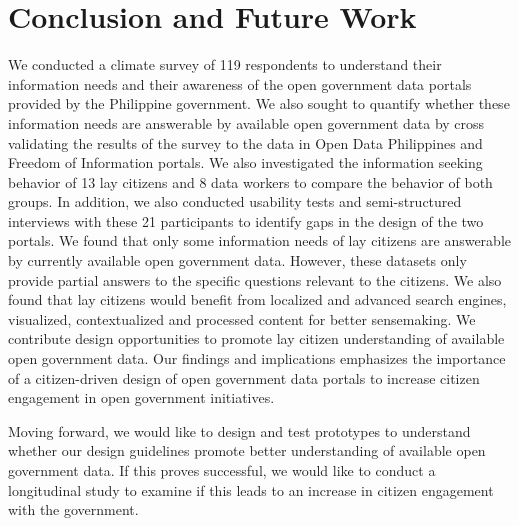 \documentclass{sigchi}
\begin{document}
\section{Conclusion and Future Work}
We conducted a climate survey of 119 respondents to understand their information needs and their awareness of the open government data portals provided by the Philippine government. We also sought to quantify whether these information needs are answerable by available open government data by cross validating the results of the survey to the data in Open Data Philippines and Freedom of Information portals. We also investigated the information seeking behavior of 13 lay citizens and 8 data workers to compare the behavior of both groups. In addition, we also conducted usability tests and semi-structured interviews with these 21 participants to identify gaps in the design of the two portals. We found that only some information needs of lay citizens are answerable by currently available open government data. However, these datasets only provide partial answers to the specific questions relevant to the citizens. We also found that lay citizens would benefit from localized and advanced search engines, visualized, contextualized and processed content for better sensemaking. We contribute design opportunities to promote lay citizen understanding of available open government data. Our findings and implications emphasizes the importance of a citizen-driven design of open government data portals to increase citizen engagement in open government initiatives.

Moving forward, we would like to design and test prototypes to understand whether our design guidelines promote better understanding of available open government data. If this proves successful, we would like to conduct a longitudinal study to examine if this leads to an increase in citizen engagement with the government. 

\end{document}
